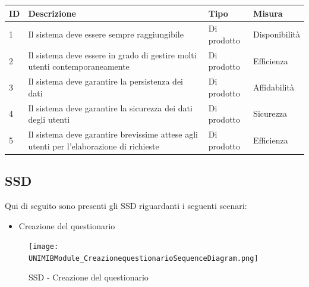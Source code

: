 \documentclass[12pt]{article}
\begin{document}
	\begin{table}[H]
		\begin{adjustbox}{max width=1.1\textwidth,center}
			\begin{tabular}{|l|l|l|l|}
				\hline
				\rowcolor[HTML]{3531FF} 
				{\color[HTML]{FFFFFF} ID} & {\color[HTML]{FFFFFF} Descrizione}                                                      & {\color[HTML]{FFFFFF} Tipo} & {\color[HTML]{FFFFFF} Misura} \\ \hline
				1                         & Il sistema deve essere sempre raggiungibile                                             & Di prodotto                 & Disponibilità                 \\ \hline
				2                         & Il sistema deve essere in grado di gestire molti utenti contemporaneamente              & Di prodotto                 & Efficienza                    \\ \hline
				3                         & Il sistema deve garantire la persistenza dei dati                                       & Di prodotto                 & Affidabilità                  \\ \hline
				4                         & Il sistema deve garantire la sicurezza dei dati degli utenti                            & Di prodotto                 & Sicurezza                     \\ \hline
				5                         & Il sistema deve garantire brevissime attese agli utenti per l'elaborazione di richieste & Di prodotto                 & Efficienza                    \\ \hline
			\end{tabular}
		\end{adjustbox}
	\end{table}
	
	
	
	
	
	
	
	\subsection{SSD}
	Qui di seguito sono presenti gli SSD riguardanti i seguenti scenari:
	\begin{itemize}
		\item Creazione del questionario
	\end{itemize}
	
	\begin{figure}[H]
		\centering
		\texttt{[image: UNIMIBModule\_CreazionequestionarioSequenceDiagram.png]}
		\caption{SSD - Creazione del questionario}
	\end{figure}
	
\end{document}
